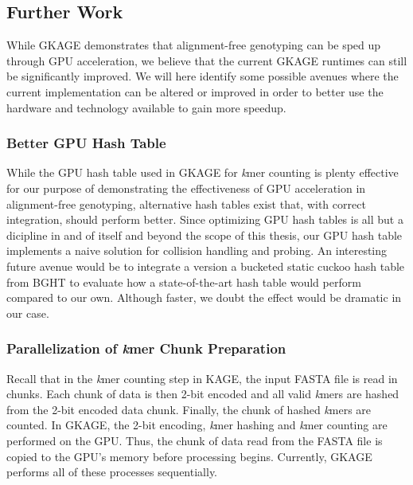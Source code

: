 \subsection{Further Work}
While GKAGE demonstrates that alignment-free genotyping can be sped up through GPU acceleration, we believe that the current GKAGE runtimes can still be significantly improved.
We will here identify some possible avenues where the current implementation can be altered or improved in order to better use the hardware and technology available to gain more speedup.

\subsubsection{Better GPU Hash Table}
While the GPU hash table used in GKAGE for \textit{k}mer counting is plenty effective for our purpose of demonstrating the effectiveness of GPU acceleration in alignment-free genotyping, alternative hash tables exist that, with correct integration, should perform better.
Since optimizing GPU hash tables is all but a dicipline in and of itself and beyond the scope of this thesis, our GPU hash table implements a naive solution for collision handling and probing.
An interesting future avenue would be to integrate a version a bucketed static cuckoo hash table from BGHT \cite{bght} to evaluate how a state-of-the-art hash table would perform compared to our own.
Although faster, we doubt the effect would be dramatic in our case.

\subsubsection{Parallelization of \textit{k}mer Chunk Preparation}
Recall that in the \textit{k}mer counting step in KAGE, the input FASTA file is read in chunks.
Each chunk of data is then 2-bit encoded and all valid \textit{k}mers are hashed from the 2-bit encoded data chunk.
Finally, the chunk of hashed \textit{k}mers are counted.
In GKAGE, the 2-bit encoding, \textit{k}mer hashing and \textit{k}mer counting are performed on the GPU.
Thus, the chunk of data read from the FASTA file is copied to the GPU's memory before processing begins.
Currently, GKAGE performs all of these processes sequentially.

